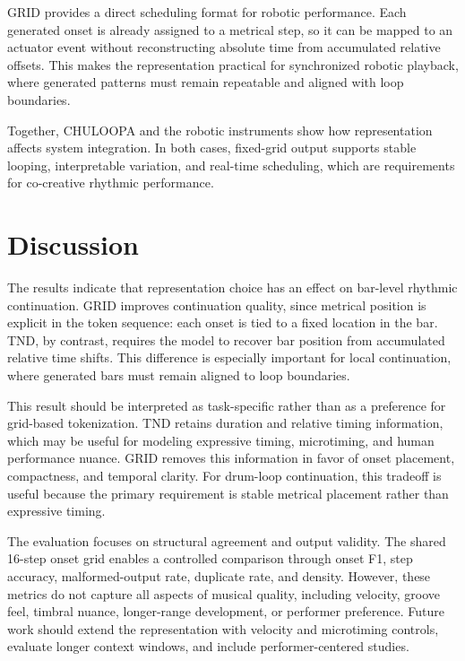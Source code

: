 \documentclass{article}
\begin{document}
GRID provides a direct scheduling format for robotic performance. Each generated onset is already assigned to a metrical step, so it can be mapped to an actuator event without reconstructing absolute time from accumulated relative offsets. This makes the representation practical for synchronized robotic playback, where generated patterns must remain repeatable and aligned with loop boundaries.

Together, CHULOOPA and the robotic instruments show how representation affects system integration. In both cases, fixed-grid output supports stable looping, interpretable variation, and real-time scheduling, which are requirements for co-creative rhythmic performance.



\section{Discussion}\label{sec:discussion}

The results indicate that representation choice has an effect on bar-level rhythmic continuation. GRID improves continuation quality, since metrical position is explicit in the token sequence: each onset is tied to a fixed location in the bar. TND, by contrast, requires the model to recover bar position from accumulated relative time shifts. This difference is especially important for local continuation, where generated bars must remain aligned to loop boundaries.

This result should be interpreted as task-specific rather than as a preference for grid-based tokenization. TND retains duration and relative timing information, which may be useful for modeling expressive timing, microtiming, and human performance nuance. GRID removes this information in favor of onset placement, compactness, and temporal clarity. For drum-loop continuation, this tradeoff is useful because the primary requirement is stable metrical placement rather than expressive timing.

The evaluation focuses on structural agreement and output validity. The shared 16-step onset grid enables a controlled comparison through onset F1, step accuracy, malformed-output rate, duplicate rate, and density. However, these metrics do not capture all aspects of musical quality, including velocity, groove feel, timbral nuance, longer-range development, or performer preference. Future work should extend the representation with velocity and microtiming controls, evaluate longer context windows, and include performer-centered studies.
\end{document}

